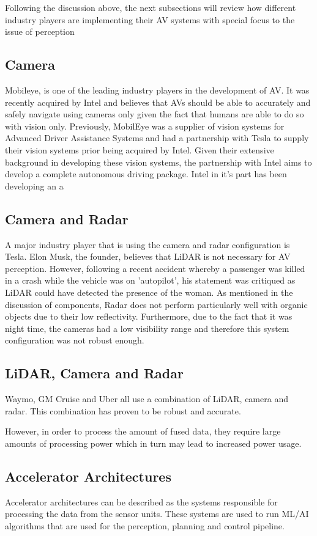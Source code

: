 Following the discussion above, the next subsections will review how different industry players are implementing their AV systems with special focus to the issue of perception
\subsection{Camera}
Mobileye, is one of the leading industry players in the development of AV. It was recently acquired by Intel and believes that AVs should be able to accurately and safely navigate using cameras only given the fact that humans are able to do so with vision only. Previously, MobilEye was a supplier of vision systems for Advanced Driver Assistance Systems and had a partnership with Tesla to supply their vision systems prior being acquired by Intel. 
Given their extensive background in developing these vision systems, the partnership with Intel aims to develop a complete autonomous driving package. Intel  in it's part has been developing an a
 

\subsection{Camera and  Radar}
A major industry player that is using the camera and radar configuration is Tesla. Elon Musk, the founder, believes that LiDAR is not necessary for AV perception. However, following a recent accident whereby a passenger was killed in a crash while the vehicle was on 'autopilot', his statement was critiqued as LiDAR could have detected the presence of the woman. As mentioned in the discussion of components, Radar does not perform particularly well with organic objects due to their low reflectivity. Furthermore, due to the fact that it was night time, the cameras had a low visibility range and therefore this system configuration was not robust enough. 


\subsection{LiDAR, Camera and Radar}
Waymo, GM Cruise and Uber all use a combination of LiDAR, camera and radar. This combination has proven to be robust and accurate.

 However, in order to process the amount of fused data, they require large amounts of processing power which in turn may lead to increased power usage. 

\subsection{Accelerator Architectures}
Accelerator architectures can be described as the systems responsible for processing the data from the sensor units. These systems are used to run ML/AI algorithms that are used for the perception, planning and control pipeline. 
